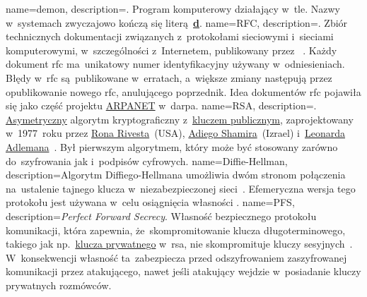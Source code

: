 {
	name={demon},
	description={. Program komputerowy działający w~tle. Nazwy  w~systemach  zwyczajowo kończą się literą~\href{https://unix.stackexchange.com/questions/72587/why-do-some-linux-files-have-a-d-suffix}{\textbf{d}}.}
}
{
	name={RFC},
	description={. Zbiór technicznych dokumentacji związanych z~protokołami sieciowymi i~sieciami komputerowymi, w~szczególności z~Internetem, publikowany przez ~\cite{rfc-editor}. Każdy dokument \gls{rfc} ma~unikatowy numer identyfikacyjny używany w~odniesieniach. Błędy w~\gls{rfc} są~publikowane w~erratach, a~większe zmiany następują przez opublikowanie nowego \gls{rfc}, anulującego poprzednik. Idea dokumentów \gls{rfc} pojawiła się jako część projektu \href{https://en.wikipedia.org/wiki/ARPANET}{ARPANET} w~\gls{darpa}.}
}
{
	name={RSA},
	description={. \href{https://en.wikipedia.org/wiki/Public-key_cryptography}{Asymetryczny} algorytm kryptograficzny z~\href{https://en.wikipedia.org/wiki/Public-key_cryptography}{kluczem publicznym}, zaprojektowany w~1977~roku przez \href{https://en.wikipedia.org/wiki/Ron_Rivest}{Rona Rivesta}~(USA), \href{https://en.wikipedia.org/wiki/Adi_Shamir}{Adiego Shamira}~(Izrael) i~\href{https://en.wikipedia.org/wiki/Leonard_Adleman}{Leonarda Adlemana}~\cite{wiki:rsa,rsa}. Był pierwszym algorytmem, który może być stosowany zarówno do~szyfrowania jak i~podpisów cyfrowych.}
}
{
	name={Diffie-Hellman},
	description={Algorytm Diffiego-Hellmana umożliwia dwóm stronom połączenia na~ustalenie tajnego klucza w~niezabezpieczonej sieci~\cite{mimuw-ssl-w04}. Efemeryczna wersja tego protokołu jest używana w~celu osiągnięcia własności .}
}
{
	name={PFS},
	description={\emph{Perfect Forward Secrecy}. Własność bezpiecznego protokołu komunikacji, która zapewnia, że~skompromitowanie klucza długoterminowego, takiego jak np.~\href{https://en.wikipedia.org/wiki/Public-key_cryptography}{klucza prywatnego} w~\gls{rsa}, nie skompromituje kluczy sesyjnych~\cite{wiki:pfs}. W~konsekwencji własność ta~zabezpiecza przed odszyfrowaniem zaszyfrowanej komunikacji przez atakującego, nawet jeśli atakujący wejdzie w~posiadanie kluczy prywatnych rozmówców.}
}
